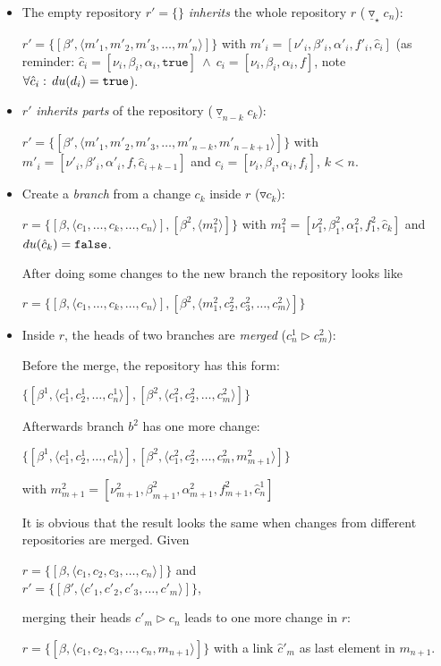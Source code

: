 \documentclass[fleqn, 10pt, a4paper]{article}
\begin{document}
\begin{itemize}
\item The empty repository $r'=\{\}$ \emph{inherits} the whole repository $r$
($\underline\triangledown_\star c_n$):

$r' = \{[\beta', \langle m'_1, m'_2, m'_3, \ldots, m'_n\rangle]\}$ with
$m'_i = [\nu'_i, \beta'_i, \alpha'_i, f'_i, \hat c_i]$ (as reminder:
$\hat c_i = [\nu_i, \beta_i, \alpha_i, \mathtt{true}]\
\wedge\ c_i=[\nu_i, \beta_i, \alpha_i, f]$, note $\forall
\hat c_i:\, \mathnormal{du}(d_i)=\mathtt{true}$).

\item $r'$ \emph{inherits parts} of the repository ($\underline\triangledown_
{n-k}c_k$):

$r'=\{[\beta', \langle m'_1, m'_2, m'_3, \ldots, m'_{n-k}, m'_{n-k+1}\rangle]\}$ with
$m'_i=[\nu'_i, \beta'_i, \alpha'_i, f, \hat c_{i+k-1}]$ and
$c_{i}=[\nu_i, \beta_i, \alpha_i, f_i]$, $k<n$.

\item Create a \emph{branch} from a change $c_k$ inside $r$
($\triangledown c_k$):

$r = \{[\beta, \langle c_1, \ldots, c_k, \ldots, c_n\rangle], [\beta^2, \langle m_1^2
\rangle]\}$ with $m_1^2=[\nu_1^2, \beta_1^2, \alpha_1^2, f_1^2, \hat c_k]$ and
$\mathnormal{du}(\hat c_k)=\mathtt{false}$.	

After doing some changes to the new branch the repository looks like

$r = \{[\beta, \langle c_1, \ldots, c_k, \ldots, c_n\rangle], [\beta^2, \langle m_1^2,
c_2^2, c_3^2, \ldots, c_m^2\rangle ]\}$

\item Inside $r$, the heads of two branches are \emph{merged}
($c_n^1 \rhd
 c_m^2$):

Before the merge, the repository has this form:

$\{[\beta^1, \langle c_1^1, c_2^1, \ldots, c_n^1\rangle],
[\beta^2, \langle c_1^2, c_2^2, \ldots, c_m^2\rangle]\}$	

Afterwards branch $b^2$ has one more change:

$\{[\beta^1, \langle c_1^1, c_2^1, \ldots, c_n^1\rangle],
[\beta^2, \langle c_1^2, c_2^2, \ldots, c_m^2, m_{m+1}^2\rangle]\}$

with $m_{m+1}^2=[\nu_{m+1}^2, \beta_{m+1}^2, \alpha_{m+1}^2, f_{m+1}^2,
\hat c_n^1]$

It is obvious that the result looks the same when changes
from different repositories are merged. Given

$r = \{[\beta, \langle c_1, c_2, c_3, \ldots, c_n\rangle]\}$ and \\
$r' = \{[\beta', \langle c'_1, c'_2, c'_3, \ldots, c'_m\rangle]\}$,

merging their heads $c'_m \rhd c_n$ leads to one more change in
$r$:

$r = \{[\beta, \langle c_1, c_2, c_3, \ldots, c_n, m_{n+1}\rangle]\}$
with a link $\hat c'_m$ as last element in $m_{n+1}$.
\end{itemize}
\end{document}
